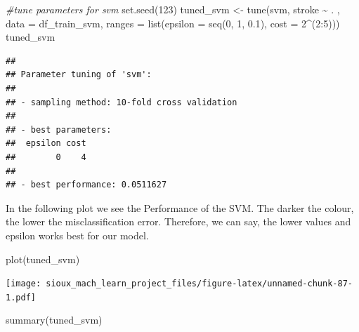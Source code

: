 \documentclass[
]{article}
\newenvironment{Shaded}{\begin{snugshade}}{\end{snugshade}}
\newcommand{\AttributeTok}[1]{\textcolor[rgb]{0.77,0.63,0.00}{#1}}
\newcommand{\CommentTok}[1]{\textcolor[rgb]{0.56,0.35,0.01}{\textit{#1}}}
\newcommand{\DecValTok}[1]{\textcolor[rgb]{0.00,0.00,0.81}{#1}}
\newcommand{\FloatTok}[1]{\textcolor[rgb]{0.00,0.00,0.81}{#1}}
\newcommand{\FunctionTok}[1]{\textcolor[rgb]{0.00,0.00,0.00}{#1}}
\newcommand{\NormalTok}[1]{#1}
\newcommand{\OtherTok}[1]{\textcolor[rgb]{0.56,0.35,0.01}{#1}}
\newcommand{\SpecialCharTok}[1]{\textcolor[rgb]{0.00,0.00,0.00}{#1}}
\renewcommand{\=}[1]{\stackrel{#1}{=}}
\theoremstyle{definition}
\theoremstyle{remark}
\begin{document}
\begin{Shaded}
\begin{Highlighting}[]
\CommentTok{\#tune parameters for svm}
\FunctionTok{set.seed}\NormalTok{(}\DecValTok{123}\NormalTok{)}
\NormalTok{tuned\_svm }\OtherTok{\textless{}{-}} \FunctionTok{tune}\NormalTok{(svm, stroke }\SpecialCharTok{\textasciitilde{}}\NormalTok{ . , }\AttributeTok{data =}\NormalTok{ df\_train\_svm, }\AttributeTok{ranges =} \FunctionTok{list}\NormalTok{(}\AttributeTok{epsilon =} \FunctionTok{seq}\NormalTok{(}\DecValTok{0}\NormalTok{, }\DecValTok{1}\NormalTok{, }\FloatTok{0.1}\NormalTok{), }\AttributeTok{cost =} \DecValTok{2}\SpecialCharTok{\^{}}\NormalTok{(}\DecValTok{2}\SpecialCharTok{:}\DecValTok{5}\NormalTok{)))}
\NormalTok{tuned\_svm}
\end{Highlighting}
\end{Shaded}

\begin{verbatim}
## 
## Parameter tuning of 'svm':
## 
## - sampling method: 10-fold cross validation 
## 
## - best parameters:
##  epsilon cost
##        0    4
## 
## - best performance: 0.0511627
\end{verbatim}

In the following plot we see the Performance of the SVM. The darker the colour, the lower the misclassification error. Therefore, we can say, the lower values and epsilon works best for our model.

\begin{Shaded}
\begin{Highlighting}[]
\FunctionTok{plot}\NormalTok{(tuned\_svm)}
\end{Highlighting}
\end{Shaded}

\texttt{[image: sioux\_mach\_learn\_project\_files/figure-latex/unnamed-chunk-87-1.pdf]}

\begin{Shaded}
\begin{Highlighting}[]
\FunctionTok{summary}\NormalTok{(tuned\_svm)}
\end{Highlighting}
\end{Shaded}
\end{document}
